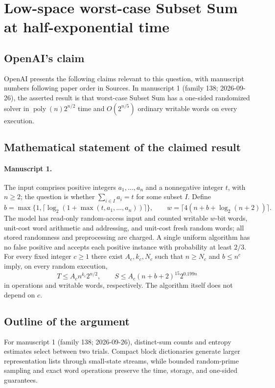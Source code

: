 \documentclass[11pt]{article}
\begin{document}
\section*{Low-space worst-case Subset Sum at half-exponential time}

\subsection{OpenAI's claim}
OpenAI presents the following claims relevant to this question, with manuscript numbers following paper order in Sources. In manuscript 1 (family 138; 2026-09-26), the asserted result is that worst-case Subset Sum has a one-sided randomized solver in $\operatorname{poly}(n)2^{n/2}$ time and $O(2^{n/5})$ ordinary writable words on every execution.

\subsection{Mathematical statement of the claimed result}
\paragraph{Manuscript 1.}
The input comprises positive integers $a_1,\ldots,a_n$ and a nonnegative integer $t$, with $n\ge2$; the question is whether $\sum_{i\in I}a_i=t$ for some subset $I$. Define
\[
 b=\max\{1,\lceil\log_2(1+\max(t,a_1,\ldots,a_n))\rceil\},\qquad
 w=\lceil4(n+b+\log_2(n+2))\rceil.
\]
The model has read-only random-access input and counted writable $w$-bit words, unit-cost word arithmetic and addressing, and unit-cost fresh random words; all stored randomness and preprocessing are charged. A single uniform algorithm has no false positive and accepts each positive instance with probability at least $2/3$. For every fixed integer $c\ge1$ there exist $A_c,k_c,N_c$ such that $n\ge N_c$ and $b\le n^c$ imply, on every random execution,
\[
 T\le A_c n^{k_c}2^{n/2},\qquad S\le A_c(n+b+2)^{15}2^{0.199n}
\]
in operations and writable words, respectively. The algorithm itself does not depend on $c$.

\subsection{Outline of the argument}
For manuscript 1 (family 138; 2026-09-26), distinct-sum counts and entropy estimates select between two trials. Compact block dictionaries generate larger representation lists through small-state streams, while bounded random-prime sampling and exact word operations preserve the time, storage, and one-sided guarantees.
\end{document}
